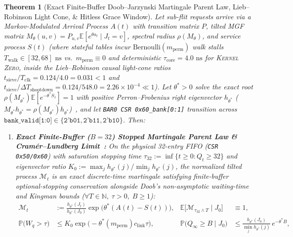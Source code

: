\documentclass[11pt,letterpaper]{article}
\theoremstyle{spectralthm}
\newtheorem{theorem}{Theorem}[section]
\begin{document}
\begin{theorem}[Exact Finite-Buffer Doob--Jarzynski Martingale Parent Law, Lieb--Robinson Light Cone, \& Hitless Grace Window]
\label{thm:martingale}
Let sub-flit requests arrive via a Markov-Modulated Arrival Process $A(t)$ with transition matrix $P$, tilted MGF matrix $M_\theta(u,v) = P_{u,v} \mathbb{E}[e^{\theta a_t} \mid J_t = v]$, spectral radius $\rho(M_\theta)$, and service process $S(t)$ (where stateful tables incur $\mathrm{Bernoulli}(m_{\mathrm{perm}})$ walk stalls $T_{\mathrm{walk}} \in [32, 68]\text{~ns}$ vs.\ $m_{\mathrm{perm}} \equiv 0$ and deterministic $\tau_{\mathrm{core}} = 4.0\text{~ns}$ for \textsc{Kernel Zero}, inside the Lieb--Robinson causal light-cone ratios~\cite{mckean1967curvature} $t_{\mathrm{sieve}}/T_{\mathrm{clk}} = 0.124/4.0 = 0.031 < 1$ and $t_{\mathrm{sieve}}/\Delta T_{\mathrm{shootdown}} = 0.124/548.0 = 2.26 \times 10^{-4} \ll 1$). Let $\theta^* > 0$ solve the exact root $\rho(M_{\theta^*}) \mathbb{E}[e^{-\theta^* S_1}] = 1$ with positive Perron--Frobenius \emph{right} eigenvector $h_{\theta^*}$ ($M_{\theta^*} h_{\theta^*} = \rho(M_{\theta^*}) h_{\theta^*}$)~\cite{poloczek2014martingale}, and let \texttt{BAR0 CSR 0x60\_bank[0:1]} transition across $\texttt{bank\_valid[1:0]} \in \{\texttt{2'b01}, \texttt{2'b11}, \texttt{2'b10}\}$. Then:
\begin{enumerate}
  \item[(i)] \textbf{Exact Finite-Buffer ($B=32$) Stopped Martingale Parent Law \& Cram\'{e}r--Lundberg Limit~\cite{poloczek2014martingale}:} On the physical 32-entry FIFO (\texttt{CSR 0x50/0x60}) with saturation stopping time $\tau_{32} := \inf\{t \ge 0 : Q_t \ge 32\}$ and eigenvector ratio $K_0 := \max_j h_{\theta^*}(j) / \min_j h_{\theta^*}(j)$, the normalized tilted process $\mathcal{M}_t$ is an exact discrete-time martingale satisfying finite-buffer optional-stopping conservation alongside Doob's non-asymptotic waiting-time and Kingman bounds ($\forall T \in \mathbb{N},\; \tau > 0,\; B \ge 1$):
  \begin{equation}
  \label{eq:martingale_tail}
  \begin{aligned}
  \mathcal{M}_t &:= \frac{h_{\theta^*}(J_t)}{h_{\theta^*}(J_0)}\exp\bigl(\theta^*(A(t) - S(t))\bigr), &
  \mathbb{E}\bigl[\mathcal{M}_{\tau_{32} \wedge T} \mid J_0\bigr] &\equiv 1, \\
  \mathbb{P}\bigl(W_q > \tau\bigr) &\le K_0 \exp\bigl(-\theta^*(m_{\mathrm{perm}}) c_{\mathrm{link}} \tau\bigr), &
  \mathbb{P}\bigl(Q_\infty \ge B \mid J_0\bigr) &\le \frac{h_{\theta^*}(J_0)}{\min_j h_{\theta^*}(j)}\,e^{-\theta^* B},

\end{aligned}
\end{equation}
\end{enumerate}
\end{theorem}
\end{document}
